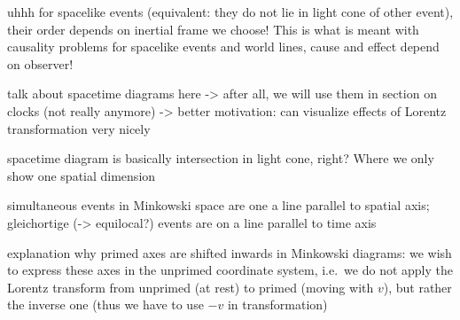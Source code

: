 uhhh for spacelike events (equivalent: they do not lie in light cone of other event), their order depends on inertial frame we choose! This is what is meant with causality problems for spacelike events and world lines, cause and effect depend on observer!


talk about spacetime diagrams here -> after all, we will use them in section on clocks (not really anymore) -> better motivation: can visualize effects of Lorentz transformation very nicely

spacetime diagram is basically intersection in light cone, right? Where we only show one spatial dimension


simultaneous events in Minkowski space are one a line parallel to spatial axis; gleichortige (-> equilocal?) events are on a line parallel to time axis



explanation why primed axes are shifted inwards in Minkowski diagrams: we wish to express these axes in the unprimed coordinate system, i.e.~we do not apply the Lorentz transform from unprimed (at rest) to primed (moving with $v$), but rather the inverse one (thus we have to use $-v$ in transformation)




